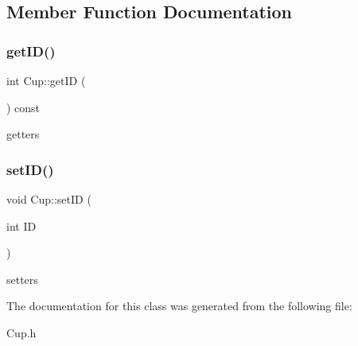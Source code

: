 \subsection{Member Function Documentation}
\mbox{\label{classCup_afba137db1fb0642aac55f5677fe01763}} 
\subsubsection{\texorpdfstring{get\+I\+D()}{getID()}}
{\footnotesize\ttfamily int Cup\+::get\+ID (\begin{DoxyParamCaption}{ }\end{DoxyParamCaption}) const\hspace{0.3cm}{\ttfamily [inline]}}

getters \mbox{\label{classCup_a5f0cbe5a1263d430d373a38e33d4d121}} 
\subsubsection{\texorpdfstring{set\+I\+D()}{setID()}}
{\footnotesize\ttfamily void Cup\+::set\+ID (\begin{DoxyParamCaption}\item[{int}]{ID }\end{DoxyParamCaption})\hspace{0.3cm}{\ttfamily [inline]}}

setters 

The documentation for this class was generated from the following file\+:\begin{DoxyCompactItemize}
\item 
Cup.\+h\end{DoxyCompactItemize}
